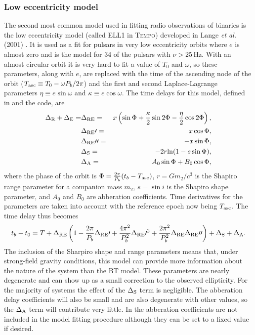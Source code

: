 \subsubsection{Low eccentricity model}
The second most common model used in fitting radio observations of binaries is the low eccentricity
model (called ELL1 in T\textsc{empo}) developed in Lange {\it et al.} (2001) \cite{Lange:2001}. It
is used as a fit for pulsars in very low eccentricity orbits where $e$ is almost zero and is the
model for 34 of the pulsars with $\nu > 25$\,Hz. With an almost circular orbit it is very hard to
fit a value of $T_0$ and $\omega$, so these parameters, along with $e$, are replaced with the time
of the ascending node of the orbit ($T_{\rm{asc}} \equiv T_0 - \omega{}P_b/2\pi$) and the first and
second Laplace-Lagrange parameters $\eta \equiv e\sin{\omega}$ and $\kappa \equiv e\cos{\omega}$.
The time delays for this model, defined in \cite{Lange:2001} and the \tempo code, are
\begin{eqnarray}\label{ELL1DRE}
\Delta_{\rm{R}} + \Delta_{\rm{E}} = & \Delta_{\rm{RE}} =&  x\left(\sin{\Phi} +
\frac{\kappa}{2}\sin{2\Phi} - \frac{\eta}{2}\cos{2\Phi}\right),\\
& \Delta_{\rm{RE}}\prime = & x\cos{\Phi}, \\
& \Delta_{\rm{RE}}\prime\prime = & -x\sin{\Phi}, \\
& \Delta_{\rm{S}} = & -2r{\rm{ln}}(1 - s \sin{\Phi}), \\
& \Delta_{\rm{A}} = & A_0\sin{\Phi} + B_0\cos{\Phi},
\end{eqnarray}
where the phase of the orbit is $\Phi = \frac{2\pi}{P_b}(t_b-T_{\rm{asc}})$, $r=Gm_2/c^3$ is the
Shapiro range parameter for a companion mass $m_2$, $s = \sin{}i$ is the Shapiro shape parameter,
and $A_0$ and $B_0$ are abberation coefficients. Time derivatives for the parameters are taken
into account with the reference epoch now being $T_{\rm{asc}}$. The time delay thus becomes
\begin{equation}\label{ELL1DT}
t_b - t_0 = T + \Delta_{\rm{RE}}\left(1 - \frac{2\pi}{P_b}\Delta_{\rm{RE}}\prime +
\frac{4\pi^2}{P_b^2}\Delta_{\rm{RE}}\prime^2 +
\frac{2\pi^2}{P_b^2}\Delta_{\rm{RE}}\Delta_{\rm{RE}}\prime\prime\right) + \Delta_{\rm{S}} +
\Delta_{\rm{A}}.
\end{equation}
The inclusion of the Sharpiro shape and range parameters means that, under strong-field gravity 
conditions, this model can provide more information about the nature of the system than the BT
model. These parameters are nearly degenerate and can show up as a small correction to the observed
ellipticity. For the majority of systems the effect of the $\Delta_{\rm{S}}$ term is negligible. The
abberation delay coefficients will also be small and are also degenerate with other values, so the
$\Delta_{\rm{A}}$ term will contribute very little. In \tempo the abberation coefficients are not
included in the model fitting procedure although they can be set to a fixed value if desired.

